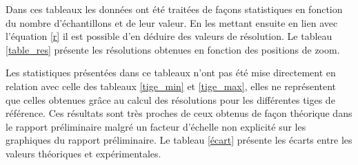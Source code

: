 \documentclass[11pt,letterpaper]{article}
\begin{document}
Dans ces tableaux les données ont été traitées de façons statistiques en fonction du nombre d'échantillons et de leur valeur. En les mettant ensuite en lien avec l'équation \ref{r} il est possible d'en déduire des valeurs de résolution. Le tableau \ref{table_res} présente les résolutions obtenues en fonction des positions de zoom. 

\begin{table}[h!]
\centering
{}
\caption{Tableau de la résolution en fonction de la position du zoom.}
\label{max_patron}
\end{table}

Les statistiques présentées dans ce tableaux n'ont pas été mise directement en relation avec celle des tableaux \ref{tige_min} et \ref{tige_max}, elles ne représentent que celles obtenues grâce au calcul des résolutions pour les différentes tiges de référence. Ces résultats sont très proches de ceux obtenus de façon théorique dans le rapport préliminaire malgré un facteur d'échelle non explicité sur les graphiques du rapport préliminaire. Le tableau \ref{écart} présente les écarts entre les valeurs théoriques et expérimentales. 

\begin{table}[h!]
\centering
{}
\caption{Tableau des écarts entre les valeurs théoriques et expérimentales.}
\label{écart}
\end{table}
\end{document}
